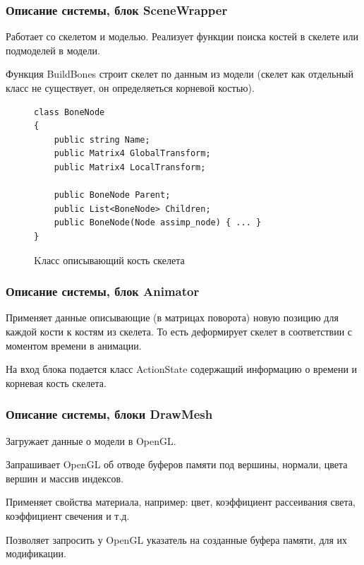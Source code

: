 \documentclass{beamer}
\begin{document}
\begin{frame}[fragile]
\frametitle{Описание системы, блок SceneWrapper}
\begin{multicols}{2}
    Работает со скелетом и моделью. Реализует функции поиска костей в скелете или подмоделей в модели.
    
    \smallskip
    Функция BuildBones строит скелет по данным из модели (скелет как отдельный класс не существует, он определяеться корневой костью). 
    
    \columnbreak
    
\begin{figure}
\begin{scriptsize}
\begin{verbatim}
class BoneNode
{
    public string Name;
    public Matrix4 GlobalTransform;
    public Matrix4 LocalTransform;
    
    public BoneNode Parent;
    public List<BoneNode> Children;
    public BoneNode(Node assimp_node) { ... }
}
\end{verbatim}
\end{scriptsize}
\caption{Kласс описывающий кость скелета}
\end{figure}

\end{multicols}
\end{frame}


\begin{frame}
\frametitle{Описание системы, блок Animator}
    Применяет данные описывающие (в матрицах поворота) новую позицию для каждой кости к костям из скелета. То есть деформирует скелет в соответствии с моментом времени в анимации.
    
    \medskip
    На вход блока подается класс ActionState содержащий информацию о времени и корневая кость скелета.
\end{frame}



\begin{frame}
\frametitle{Описание системы, блоки DrawMesh}
	Загружает данные о модели в OpenGL.
	
    \smallskip
	Запрашивает OpenGL об отводе буферов памяти под вершины, нормали, цвета вершин и массив индексов.
    
    \smallskip
    Применяет свойства материала, например: цвет, коэффициент рассеивания света, коэффициент свечения и т.д.
    
    \smallskip
    Позволяет запросить у OpenGL указатель на созданные буфера памяти, для их модификации.
\end{frame}
\end{document}
